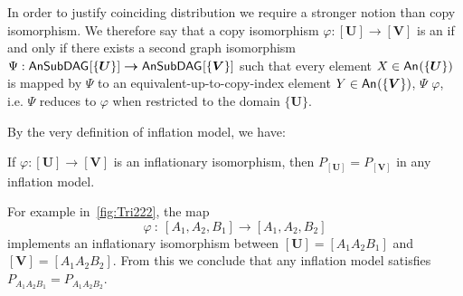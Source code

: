 In order to justify coinciding distribution we require a stronger notion than copy isomorphism. We therefore say that a copy isomorphism $\varphi:[\bm{U}]\bm{\to}[\bm{V}]$ is an  if and only if there exists a second graph isomorphism $\Psi : {\operatorname{\mathsf{AnSubDAG}}_{}}\lbrack\{\bm{U}\}\rbrack\bm{\to}{\operatorname{\mathsf{AnSubDAG}}_{}}\lbrack\{\bm{V}\}\rbrack$ such that every element $X\in{\mathsf{An}_{}}\lparen\{\bm{U}\}\rparen$ is mapped by $\Psi$ to an equivalent-up-to-copy-index element $Y\in{\mathsf{An}_{}}\lparen\{\bm{V}\}\rparen$,  $\Psi$  $\varphi$, i.e. $\Psi$ reduces to $\varphi$ when restricted to the domain $\{\bm{U}\}$.




By the very definition of inflation model, we have:
\begin{lemma}
	\label{lem:coincide}
	If $\varphi:[\bm{U}]\to[\bm{V}]$ is an inflationary isomorphism, then $P_{[\bm{U}]} = P_{[\bm{V}]}$ in any inflation model.%
\end{lemma}

For example in~\cref{fig:Tri222}, the map
\[
	\varphi \: : \: \left[A_1,A_2,B_1\right] \to \left[A_1,A_2,B_2\right]
\]
implements an inflationary isomorphism between $[\bm{U}]=\left[A_1 A_2 B_1\right]$ and $[\bm{V}]=\left[A_1 A_2 B_2\right]$. From this we conclude that any inflation model satisfies $P_{A_1 A_2 B_1} = P_{A_1 A_2 B_2}$. 

